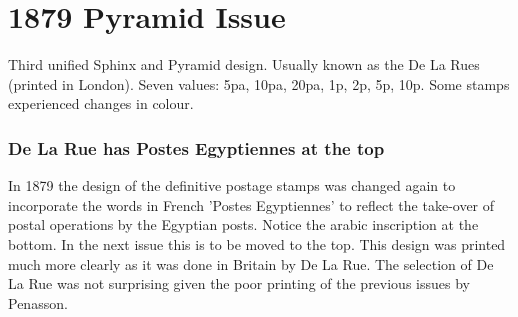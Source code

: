 \documentclass[justified]{tufte-book}
\begin{document}







\chapter{1879 Pyramid Issue}

Third unified Sphinx and Pyramid design. Usually known as the De La Rues (printed in London). Seven values: 5pa, 10pa, 20pa, 1p, 2p, 5p, 10p. Some stamps experienced changes in colour.

\subsection{De La Rue has Postes Egyptiennes at the top}

In 1879 the design of the definitive postage stamps was changed again to incorporate the words in French 'Postes Egyptiennes' to reflect the take-over of postal operations by the Egyptian posts. Notice the arabic inscription at the bottom. In the next issue this is to be moved to the top. This design was printed much more clearly as it was done in Britain by De La Rue. The selection of De La Rue was not surprising given the poor printing of the previous issues by Penasson.



















\end{document}
